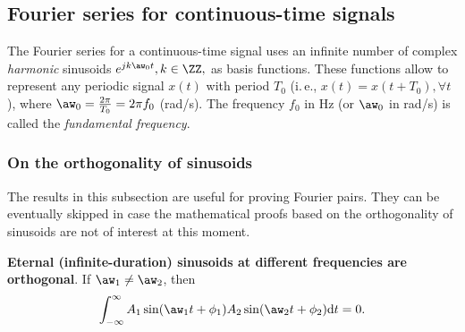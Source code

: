 \subsection{Fourier series for continuous-time signals}

The Fourier series for a continuous-time signal uses an infinite number of complex \emph{harmonic} sinusoids $e^{j k \aw_0 t}, k \in \ZZ,$ as basis functions. These functions allow to represent any periodic signal $x(t)$ with period $T_0$ (i.\,e., $x(t)=x(t+T_0), \forall t$), where $\aw_0 = \frac{2 \pi}{T_0} = 2 \pi f_0$ (rad/s). The frequency $f_0$ in Hz (or $\aw_0$ in rad/s) is called the \emph{fundamental frequency}.

\subsubsection{{\akadvanced} On the orthogonality of sinusoids}
\label{sec:orthogonality_sinusoids}

The results in this subsection are useful for proving Fourier pairs. They can be eventually skipped 
in case the mathematical proofs based on the orthogonality of sinusoids are not of interest at this moment.


\bResult
\label{ex:eternal_sinusoids} \textbf{Eternal (infinite-duration) sinusoids at different frequencies are orthogonal}. If $\aw_1 \ne \aw_2$, then 
\[
\int_{-\infty}^\infty A_1 \sin (\aw_1 t + \phi_1) A_2 \sin (\aw_2 t + \phi_2) \textrm{d}t = 0.
\] %

